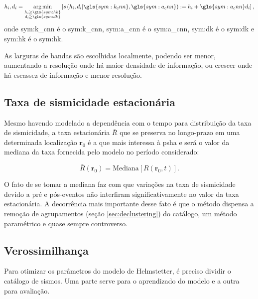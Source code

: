 \begin{equation}
	\ensuremath{
		h_i, d_i = \argmin_{\substack{h_i \ge \gls{sym:hk} \\
						              d_i \ge \gls{sym:dk}}
				           } 
		\left[ s \left(h_i,d_i 
			 		  \arrowvert
					  \gls{sym:k_cnn},\gls{sym:a_cnn}
			     \right) 
			   := h_i + \gls{sym:a_cnn}d_i 
	    \right],
	}
	\label{eq:helms_cnn}
\end{equation}
onde \gls{sym:k_cnn} é o \glsdesc{sym:k_cnn},
	 \gls{sym:a_cnn} é o \glsdesc{sym:a_cnn},
	 \gls{sym:dk} é o \glsdesc{sym:dk} e 
	 \gls{sym:hk} é o \glsdesc{sym:hk}.

As larguras de bandas são escolhidas localmente, podendo ser menor, aumentando a resolução 
onde há maior densidade de informação, ou crescer onde há escassez de informação e menor resolução.


\subsection{Taxa de sismicidade estacionária}
Mesmo havendo modelado a dependência com o tempo para distribuição da taxa de sismicidade,
a taxa estacionária $\bar{R}$ que se preserva no longo-prazo em uma determinada localização  
$\boldsymbol{r}_0$ é a que mais interessa à \gls{psha} e
será o valor da mediana da taxa fornecida pelo modelo no período considerado:

\begin{equation}
	\ensuremath{
		\bar{R}(\boldsymbol{r}_0) = \text{Mediana}\left[R(\boldsymbol{r}_0, t)\right].
	}
	\label{eq:helms_mediana}
\end{equation}

O fato de se tomar a mediana faz com que variações na taxa de sismicidade devido a pré e pós-eventos
não interfiram significativamente no valor da taxa estacionária. A decorrência mais importante desse fato
é que o método dispensa a remoção de agrupamentos (seção \ref{sec:declustering}) do catálogo, um método paramétrico e
quase sempre controverso.

\subsection{Verossimilhança}

Para otimizar os parâmetros do modelo de Helmstetter, é preciso dividir o catálogo de sismos.
Uma parte serve para o aprendizado do modelo e a outra para avaliação.

